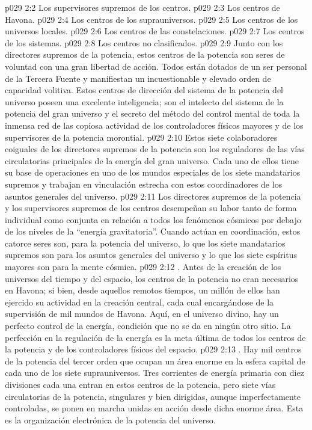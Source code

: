 \vs p029 2:2 Los supervisores supremos de los centros.
\vs p029 2:3 Los centros de Havona.
\vs p029 2:4 Los centros de los suprauniversos.
\vs p029 2:5 Los centros de los universos locales.
\vs p029 2:6 Los centros de las constelaciones.
\vs p029 2:7 Los centros de los sistemas.
\vs p029 2:8 Los centros no clasificados.
\vs p029 2:9 \pc Junto con los directores supremos de la potencia, estos centros de la potencia son seres de voluntad con una gran libertad de acción. Todos están dotados de un ser personal de la Tercera Fuente y manifiestan un incuestionable y elevado orden de capacidad volitiva. Estos centros de dirección del sistema de la potencia del universo poseen una excelente inteligencia; son el intelecto del sistema de la potencia del gran universo y el secreto del método del control mental de toda la inmensa red de las copiosa actividad de los controladores físicos mayores y de los supervisores de la potencia morontial.
\vs p029 2:10  Estos siete colaboradores coiguales de los directores supremos de la potencia son los reguladores de las vías circulatorias principales de la energía del gran universo. Cada uno de ellos tiene su base de operaciones en uno de los mundos especiales de los siete mandatarios supremos y trabajan en vinculación estrecha con estos coordinadores de los asuntos generales del universo.
\vs p029 2:11 Los directores supremos de la potencia y los supervisores supremos de los centros desempeñan su labor tanto de forma individual como conjunta en relación a todos los fenómenos cósmicos por debajo de los niveles de la “energía gravitatoria”. Cuando actúan en coordinación, estos catorce seres son, para la potencia del universo, lo que los siete mandatarios supremos son para los asuntos generales del universo y lo que los siete espíritus mayores son para la mente cósmica.
\vs p029 2:12 . Antes de la creación de los universos del tiempo y del espacio, los centros de la potencia no eran necesarios en Havona; si bien, desde aquellos remotos tiempos, un millón de ellos han ejercido su actividad en la creación central, cada cual encargándose de la supervisión de mil mundos de Havona. Aquí, en el universo divino, hay un perfecto control de la energía, condición que no se da en ningún otro sitio. La perfección en la regulación de la energía es la meta última de todos los centros de la potencia y de los controladores físicos del espacio.
\vs p029 2:13 . Hay mil centros de la potencia del tercer orden que ocupan un área enorme en la esfera capital de cada uno de los siete suprauniversos. Tres corrientes de energía primaria con diez divisiones cada una entran en estos centros de la potencia, pero siete vías circulatorias de la potencia, singulares y bien dirigidas, aunque imperfectamente controladas, se ponen en marcha unidas en acción desde dicha enorme área. Esta es la organización electrónica de la potencia del universo.
